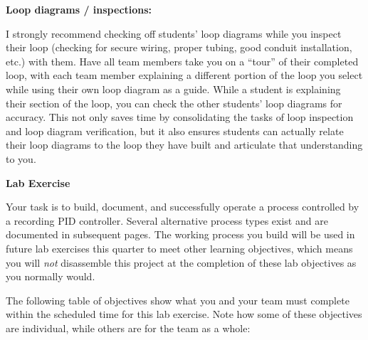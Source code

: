 












\noindent
{\bf Loop diagrams / inspections:}

I strongly recommend checking off students' loop diagrams while you inspect their loop (checking for secure wiring, proper tubing, good conduit installation, etc.) with them.  Have all team members take you on a ``tour'' of their completed loop, with each team member explaining a different portion of the loop you select while using their own loop diagram as a guide.  While a student is explaining their section of the loop, you can check the other students' loop diagrams for accuracy.  This not only saves time by consolidating the tasks of loop inspection and loop diagram verification, but it also ensures students can actually relate their loop diagrams to the loop they have built and articulate that understanding to you.






\noindent
{\bf Lab Exercise}

\vskip 5pt

Your task is to build, document, and successfully operate a process controlled by a recording PID controller.  Several alternative process types exist and are documented in subsequent pages.  The working process you build will be used in future lab exercises this quarter to meet other learning objectives, which means you will {\it not} disassemble this project at the completion of these lab objectives as you normally would.

The following table of objectives show what you and your team must complete within the scheduled time for this lab exercise.  Note how some of these objectives are individual, while others are for the team as a whole:

